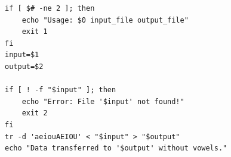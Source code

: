 \begin{verbatim}
if [ $# -ne 2 ]; then
    echo "Usage: $0 input_file output_file"
    exit 1
fi
input=$1
output=$2

if [ ! -f "$input" ]; then
    echo "Error: File '$input' not found!"
    exit 2
fi
tr -d 'aeiouAEIOU' < "$input" > "$output"
echo "Data transferred to '$output' without vowels."
\end{verbatim}